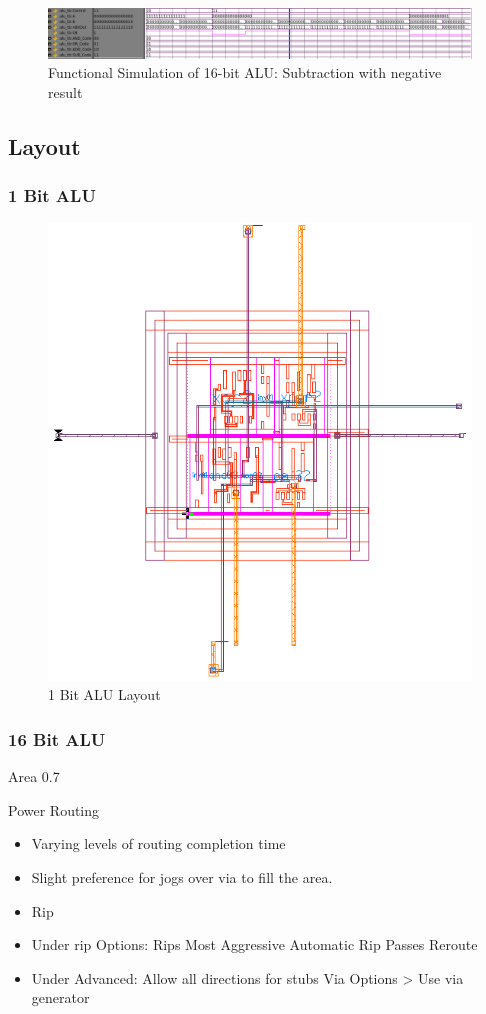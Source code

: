 \documentclass[11pt]{article}
\begin{document}
	
			\begin{figure}[H]
				\centering
				\includegraphics[width=0.7\linewidth]{"Pictures/16 Bit ALU Sub Neg"}
				\caption{Functional Simulation of 16-bit ALU: Subtraction with negative result}
				\label{fig:16-bit-alu-sub-neg}
			\end{figure}
		
		
	\subsection{Layout}
	
		\subsubsection{1 Bit ALU}
		
			\begin{figure}[H]
				\centering
				\includegraphics[width=0.7\linewidth]{"Pictures/ALU-1Bit Layout"}
				\caption{1 Bit ALU Layout}
				\label{fig:alu-1bit-layout}
			\end{figure}
			
	
		\subsubsection{16 Bit ALU}
			
			Area 0.7
			
			Power Routing
			\begin{itemize}
				\item Varying levels of routing completion time
				\item Slight preference for jogs over via to fill the area.
				\item Rip
				\item Under rip Options: 
				\subitem Rips Most Aggressive
				\subitem Automatic Rip Passes
				\subitem Reroute
				\item Under Advanced:
				\subitem Allow all directions for stubs
				\subitem Via Options > Use via generator
			\end{itemize}
		
\end{document}
